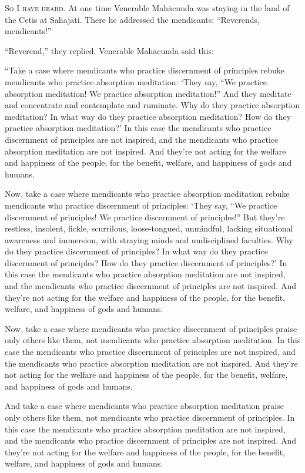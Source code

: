 \documentclass[12pt,openany]{book}%
\newcommand*{\scevam}[1]{\textsc{#1}}
\begin{document}
\scevam{So I have heard. }At one time Venerable \textsanskrit{Mahācunda} was staying in the land of the Cetis at \textsanskrit{Sahajāti}. There he addressed the mendicants: “Reverends, mendicants!” 

“Reverend,” they replied. Venerable \textsanskrit{Mahācunda} said this: 

“Take a case where mendicants who practice discernment of principles rebuke mendicants who practice absorption meditation: ‘They say, “We practice absorption meditation! We practice absorption meditation!” And they meditate and concentrate and contemplate and ruminate. Why do they practice absorption meditation? In what way do they practice absorption meditation? How do they practice absorption meditation?’ In this case the mendicants who practice discernment of principles are not inspired, and the mendicants who practice absorption meditation are not inspired. And they’re not acting for the welfare and happiness of the people, for the benefit, welfare, and happiness of gods and humans. 

Now, take a case where mendicants who practice absorption meditation rebuke mendicants who practice discernment of principles: ‘They say, “We practice discernment of principles! We practice discernment of principles!” But they’re restless, insolent, fickle, scurrilous, loose-tongued, unmindful, lacking situational awareness and immersion, with straying minds and undisciplined faculties. Why do they practice discernment of principles? In what way do they practice discernment of principles? How do they practice discernment of principles?’ In this case the mendicants who practice absorption meditation are not inspired, and the mendicants who practice discernment of principles are not inspired. And they’re not acting for the welfare and happiness of the people, for the benefit, welfare, and happiness of gods and humans. 

Now, take a case where mendicants who practice discernment of principles praise only others like them, not mendicants who practice absorption meditation. In this case the mendicants who practice discernment of principles are not inspired, and the mendicants who practice absorption meditation are not inspired. And they’re not acting for the welfare and happiness of the people, for the benefit, welfare, and happiness of gods and humans. 

And take a case where mendicants who practice absorption meditation praise only others like them, not mendicants who practice discernment of principles. In this case the mendicants who practice absorption meditation are not inspired, and the mendicants who practice discernment of principles are not inspired. And they’re not acting for the welfare and happiness of the people, for the benefit, welfare, and happiness of gods and humans. 
\end{document}
